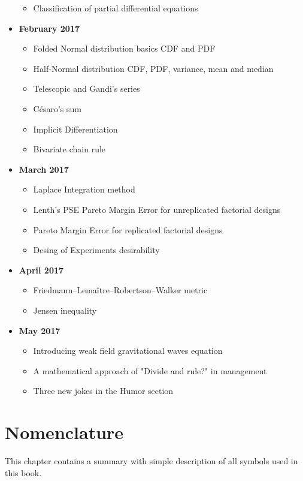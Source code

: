 \documentclass[12pt,a4paper,twoside,openright]{report}
\theoremstyle{definition}
\theoremstyle{itexmp}
\numberwithin{equation}{section}
\begin{document}
\begin{itemize}
\begin{itemize}[noitemsep]
				\item Classification of partial differential equations
			\end{itemize}
		\item \textbf{February 2017}
			\begin{itemize}[noitemsep]
				\item Folded Normal distribution basics CDF and PDF
				\item Half-Normal distribution CDF, PDF, variance, mean and median
				\item Telescopic and Gandi's series
				\item Césaro's sum
				\item Implicit Differentiation
				\item Bivariate chain rule
			\end{itemize}
		\item \textbf{March 2017}
			\begin{itemize}[noitemsep]
				\item Laplace Integration method
				\item Lenth's PSE Pareto Margin Error for unreplicated factorial designs
				\item Pareto Margin Error for replicated factorial designs
				\item Desing of Experiments desirability
			\end{itemize}
		\item \textbf{April 2017}
			\begin{itemize}[noitemsep]
				\item Friedmann–Lemaître–Robertson–Walker metric
				\item Jensen inequality
			\end{itemize}
		\item \textbf{May 2017}
			\begin{itemize}[noitemsep]
				\item Introducing weak field gravitational waves equation
				\item A mathematical approach of "Divide and rule?" in management
				\item Three new jokes in the Humor section
			\end{itemize}
	\end{itemize}

\chapter{Nomenclature}

This chapter contains a summary with simple description of all symbols used in this book.
\end{document}
